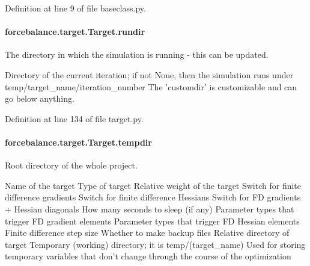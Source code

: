Definition at line 9 of file baseclass.\-py.

\hypertarget{classforcebalance_1_1target_1_1Target_a6872de5b2d4273b82336ea5b0da29c9e}{
\paragraph[{rundir}]{\setlength{\rightskip}{0pt plus 5cm}forcebalance.\-target.\-Target.\-rundir\hspace{0.3cm}{\ttfamily [inherited]}}}\label{classforcebalance_1_1target_1_1Target_a6872de5b2d4273b82336ea5b0da29c9e}


The directory in which the simulation is running -\/ this can be updated. 

Directory of the current iteration; if not None, then the simulation runs under temp/target\-\_\-name/iteration\-\_\-number The 'customdir' is customizable and can go below anything.

Definition at line 134 of file target.\-py.

\hypertarget{classforcebalance_1_1target_1_1Target_aa1f01b5b78db253b5b66384ed11ed193}{
\paragraph[{tempdir}]{\setlength{\rightskip}{0pt plus 5cm}forcebalance.\-target.\-Target.\-tempdir\hspace{0.3cm}{\ttfamily [inherited]}}}\label{classforcebalance_1_1target_1_1Target_aa1f01b5b78db253b5b66384ed11ed193}


Root directory of the whole project. 

Name of the target Type of target Relative weight of the target Switch for finite difference gradients Switch for finite difference Hessians Switch for F\-D gradients + Hessian diagonals How many seconds to sleep (if any) Parameter types that trigger F\-D gradient elements Parameter types that trigger F\-D Hessian elements Finite difference step size Whether to make backup files Relative directory of target Temporary (working) directory; it is temp/(target\-\_\-name) Used for storing temporary variables that don't change through the course of the optimization 

